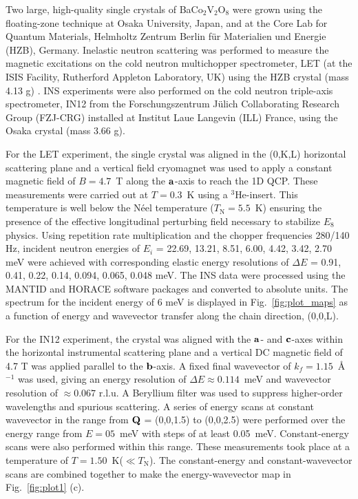 \documentclass[aps,prl,twocolumn,superscriptaddress,groupedaddress]{revtex4}
\begin{document}
\par

Two large, high-quality single crystals of BaCo$_2$V$_2$O$_8$ were grown using the floating-zone technique at Osaka University, Japan, and at the Core Lab for Quantum Materials, Helmholtz Zentrum Berlin f\"ur Materialien und Energie (HZB), Germany. Inelastic neutron scattering was performed to measure the magnetic excitations on the cold neutron multichopper spectrometer, LET (at the ISIS Facility, Rutherford Appleton Laboratory, UK) using the HZB crystal (mass 4.13 g) \cite{LET}. INS experiments were also performed on the cold neutron triple-axis spectrometer, IN12 from the Forschungszentrum Jülich Collaborating Research Group (FZJ-CRG) installed at Institut Laue Langevin (ILL) France, using the Osaka crystal (mass 3.66 g).

For the LET experiment, the single crystal was aligned in the (0,K,L) horizontal scattering plane and a vertical field cryomagnet was used to apply a constant magnetic field of $B=4.7$~T along the ${\bf a}$-axis to reach the 1D QCP. These measurements were carried out at $T=0.3$~K using a $^3$He-insert. This temperature is well below the N\'eel temperature ($T_{\mathrm{N}}=5.5$~K) ensuring the presence of the effective longitudinal perturbing field necessary to stabilize $E_8$ physics. Using repetition rate multiplication and the chopper frequencies 280/140 Hz, incident neutron energies of $E_i$ = 22.69, 13.21, 8.51, 6.00, 4.42, 3.42, 2.70 meV were achieved with corresponding elastic energy resolutions of $\Delta E$ = 0.91, 0.41, 0.22, 0.14, 0.094, 0.065, 0.048 meV. The INS data were processed using the MANTID and HORACE software packages and converted to absolute units. The spectrum for the incident energy of 6 meV is displayed in Fig.~\ref{fig:plot_maps} as a function of energy and wavevector transfer along the chain direction, (0,0,L).


For the IN12 experiment, the crystal was aligned with the ${\bf a}$- and ${\bf c}$-axes within the horizontal instrumental scattering plane and a vertical DC magnetic field of 4.7 T was applied parallel to the ${\bf b}$-axis. A fixed final wavevector of $k_f = 1.15$~\AA$^{-1}$ was used, giving an energy resolution of $\Delta E \approx 0.114$~meV and wavevector resolution of $\approx 0.067$ r.l.u. A Beryllium filter was used to suppress higher-order wavelengths and spurious scattering. A series of energy scans at constant wavevector in the range from ${\bf Q}$ = (0,0,1.5) to (0,0,2.5) were performed over the energy range from $E = 0 5$~meV with steps of at least 0.05~meV. Constant-energy scans were also performed within this range. These measurements took place at a temperature of $T = 1.50$~K($\ll T_{\mathrm{N}}$). The constant-energy and constant-wavevector scans are combined together to make the energy-wavevector map in Fig.~\ref{fig:plot1} (c).
\end{document}
